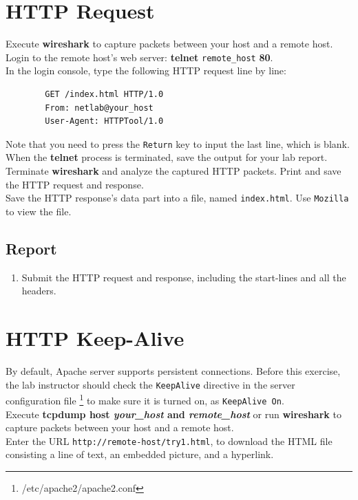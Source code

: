 \documentclass[10pt,a4paper]{article}
\numberwithin{equation}{section}
\numberwithin{figure}{section}
\numberwithin{table}{section}
\begin{document}
\section{HTTP Request}
    Execute \textbf{wireshark} to capture packets between your host and a remote host. \\
    Login to the remote host’s web server: \textbf{telnet} \texttt{remote\_host} \textbf{80}. \\
    In the login console, type the following HTTP request line by line:
    \begin{verbatim}
        GET /index.html HTTP/1.0
        From: netlab@your_host
        User-Agent: HTTPTool/1.0
    \end{verbatim}
    Note that you need to press the \texttt{Return} key to input the last line, which is blank.
    When the \textbf{telnet} process is terminated, save the output for your lab report. \\
    Terminate \textbf{wireshark} and analyze the captured HTTP packets.
    Print and save the HTTP request and response. \\
    Save the HTTP response’s data part into a file, named \texttt{index.html}.
    Use \texttt{Mozilla} to view the file.
    \subsection*{Report}
    \begin{enumerate}
        \item Submit the HTTP request and response, including the start-lines and all the headers.
    \end{enumerate}

    
\section{HTTP Keep-Alive}
    By default, Apache server supports persistent connections. Before this exercise, the lab instructor should check the \texttt{KeepAlive} directive in the server configuration file \footnote{/etc/apache2/apache2.conf} to make sure it is turned on, as \texttt{KeepAlive On}. \\
    Execute \textbf{tcpdump host \textit{your\_host} and \textit{remote\_host}} or run \textbf{wireshark} to capture packets between your host and a remote host. \\
    
    Enter the URL \texttt{http://remote-host/try1.html}, to download the HTML file consisting a line of text, an embedded picture, and a hyperlink.\\
\end{document}
